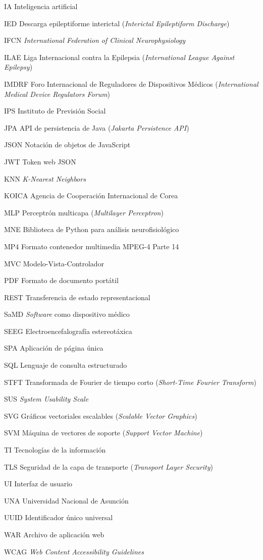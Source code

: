 \begin{abbreviations}
    \item[IA] Inteligencia artificial
    \item[IED] Descarga epileptiforme interictal (\textit{Interictal Epileptiform Discharge})
    \item[IFCN] \textit{International Federation of Clinical Neurophysiology}
    \item[ILAE] Liga Internacional contra la Epilepsia (\textit{International League Against Epilepsy})
    \item[IMDRF] Foro Internacional de Reguladores de Dispositivos Médicos (\textit{International Medical Device Regulators Forum})
    \item[IPS] Instituto de Previsión Social
    \item[JPA] API de persistencia de Java (\textit{Jakarta Persistence API})
    \item[JSON] Notación de objetos de JavaScript
    \item[JWT] Token web JSON
    \item[KNN] \textit{K-Nearest Neighbors}
    \item[KOICA] Agencia de Cooperación Internacional de Corea
    \item[MLP] Perceptrón multicapa (\textit{Multilayer Perceptron})
    \item[MNE] Biblioteca de Python para análisis neurofisiológico
    \item[MP4] Formato contenedor multimedia MPEG-4 Parte 14
    \item[MVC] Modelo-Vista-Controlador
    \item[PDF] Formato de documento portátil
    \item[REST] Transferencia de estado representacional
    \item[SaMD] \textit{Software} como dispositivo médico
    \item[SEEG] Electroencefalografía estereotáxica
    \item[SPA] Aplicación de página única
    \item[SQL] Lenguaje de consulta estructurado
    \item[STFT] Transformada de Fourier de tiempo corto (\textit{Short-Time Fourier Transform})
    \item[SUS] \textit{System Usability Scale}
    \item[SVG] Gráficos vectoriales escalables (\textit{Scalable Vector Graphics})
    \item[SVM] Máquina de vectores de soporte (\textit{Support Vector Machine})
    \item[TI] Tecnologías de la información
    \item[TLS] Seguridad de la capa de transporte (\textit{Transport Layer Security})
    \item[UI] Interfaz de usuario
    \item[UNA] Universidad Nacional de Asunción
    \item[UUID] Identificador único universal
    \item[WAR] Archivo de aplicación web
    \item[WCAG] \textit{Web Content Accessibility Guidelines}

\end{abbreviations}
\endgroup

